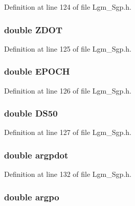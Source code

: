 Definition at line 124 of file Lgm\_\-Sgp.h.\hypertarget{struct___sgp_info_0113995221a55c2a324a49b992c3e83e}{
\subsubsection[{ZDOT}]{\setlength{\rightskip}{0pt plus 5cm}double {\bf ZDOT}}}
\label{struct___sgp_info_0113995221a55c2a324a49b992c3e83e}




Definition at line 125 of file Lgm\_\-Sgp.h.\hypertarget{struct___sgp_info_096845c6ff00da184a48b51ea1efde49}{
\subsubsection[{EPOCH}]{\setlength{\rightskip}{0pt plus 5cm}double {\bf EPOCH}}}
\label{struct___sgp_info_096845c6ff00da184a48b51ea1efde49}




Definition at line 126 of file Lgm\_\-Sgp.h.\hypertarget{struct___sgp_info_105c57f6cb86a5a9c93a1454db061841}{
\subsubsection[{DS50}]{\setlength{\rightskip}{0pt plus 5cm}double {\bf DS50}}}
\label{struct___sgp_info_105c57f6cb86a5a9c93a1454db061841}




Definition at line 127 of file Lgm\_\-Sgp.h.\hypertarget{struct___sgp_info_c9dd4d43db3b68465f53fd7841f2cb96}{
\subsubsection[{argpdot}]{\setlength{\rightskip}{0pt plus 5cm}double {\bf argpdot}}}
\label{struct___sgp_info_c9dd4d43db3b68465f53fd7841f2cb96}




Definition at line 132 of file Lgm\_\-Sgp.h.\hypertarget{struct___sgp_info_48e2d1161d18da867e275aad47a0f2f5}{
\subsubsection[{argpo}]{\setlength{\rightskip}{0pt plus 5cm}double {\bf argpo}}}
\label{struct___sgp_info_48e2d1161d18da867e275aad47a0f2f5}




